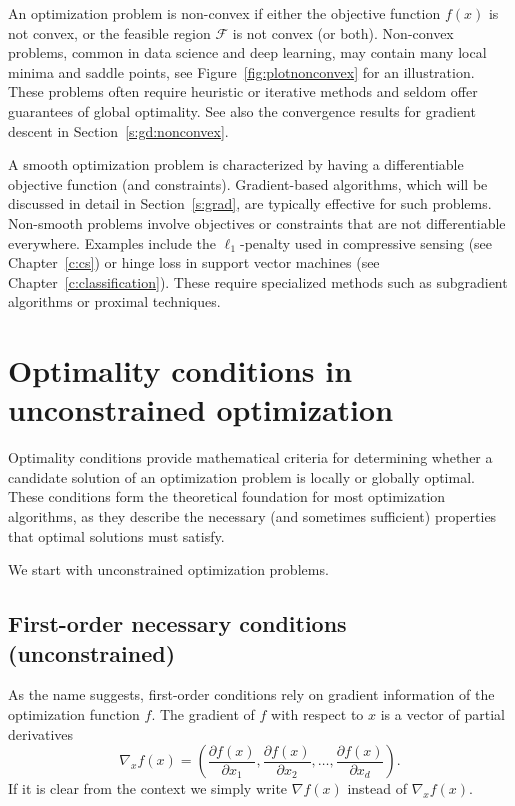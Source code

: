 An optimization problem is non-convex if either the objective function $f(x)$ is not convex, or the feasible region $\mathcal{F}$ is not convex (or both). Non-convex problems, common in data science and deep learning, may contain many local minima and saddle points, see Figure~\ref{fig:plotnonconvex} for an illustration.
These problems often require heuristic or iterative methods and seldom offer guarantees of global optimality. See also the convergence results for gradient descent in Section~\ref{s:gd:nonconvex}.




\begin{remark}

A smooth optimization problem is characterized by having a differentiable objective function (and constraints). Gradient-based algorithms, which will be discussed in detail in Section~\ref{s:grad}, are typically effective for such problems.
Non-smooth problems involve objectives or constraints that are not differentiable everywhere. Examples include the $\ell_1$-penalty used in compressive sensing (see Chapter~\ref{c:cs}) or hinge loss in support vector machines (see Chapter~\ref{c:classification}). These require specialized methods such as subgradient algorithms or proximal techniques. 

\end{remark}






\section{Optimality conditions in unconstrained optimization}\label{s:optimality}
 
Optimality conditions provide mathematical criteria for determining whether a candidate solution of an optimization problem is locally or globally optimal. These conditions form the theoretical foundation for most optimization algorithms, as they describe the necessary (and sometimes sufficient) properties that optimal solutions must satisfy.

We start with unconstrained optimization problems.


\subsection{First-order necessary conditions (unconstrained)}

As the name suggests, first-order conditions rely on gradient information of the optimization function $f$.
The gradient of $f$ with respect to $x$ is a vector of partial derivatives
\begin{equation}
\nabla_x f(x) = \left( \frac{\partial f(x)}{\partial x_1}, \frac{\partial f(x)}{\partial x_2}, \dots, \frac{\partial f(x)}{\partial x_d} \right).
\label{gradient}
\end{equation}
If it is clear from the context we simply write $\nabla f(x)$ instead of $\nabla_x f(x)$.


